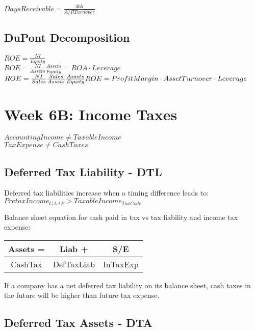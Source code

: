 $Days Receivable = \frac{365}{A/R Turnover}$  

\subsection*{DuPont Decomposition}

$ROE = \frac{NI}{Equity}$ \\

$ROE = \frac{NI}{Assets} \frac{Assets}{Equity} = ROA \cdot Leverage$  \\

$ROE = \frac{NI}{Sales} \frac{Sales}{Assets}\frac{Assets}{Equity} \\
 ROE = ProfitMargin \cdot AssetTurnover \cdot Leverage $  \\
 

\section*{Week 6B: Income Taxes}

$AccountingIncome \neq Taxable Income$ \\
$Tax Expense \neq Cash Taxes $ \\


\subsection*{Deferred Tax Liability - DTL}

Deferred tax liabilities increase when a timing difference leads to: \\
 $PretaxIncome_{GAAP}>Taxable Income_{TaxCode}	$

Balance sheet equation for cash paid in tax vs tax liability and income tax expense:
\begin{tabular}{ |c||c|c| } 
	\hline
	  Assets = & Liab +  & S/E	 \\ 
	\hline
	  CashTax & DefTaxLiab  & InTaxExp	 \\ 
   	
	\hline
\end{tabular}

If a company has a net deferred tax liability on its balance sheet, cash taxes in the future will be higher than future tax expense.
 
\subsection*{ Deferred Tax Assets - DTA}
 
